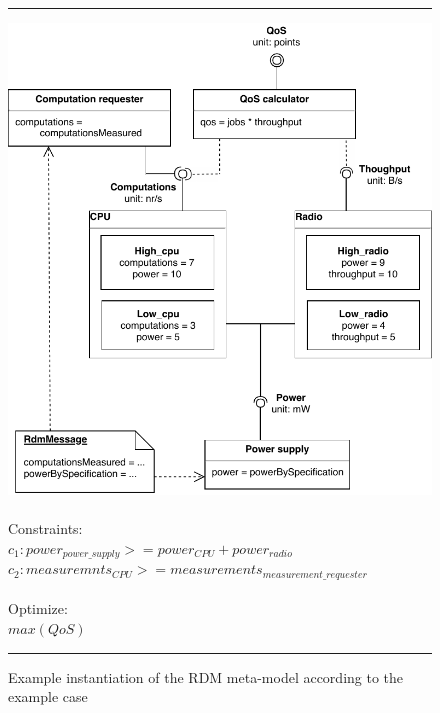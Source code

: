 \begin{figure}
\hrule
\begingroup\centering
  \includegraphics[width=\linewidth]{resources/img/rdm_cpu_radio.pdf}\endgroup \\ \\
  \noindent Constraints: \\
$c_1: power_{power\_supply} >= power_{CPU}+power_{radio} $ \\ 
$c_2: measuremnts_{CPU} >= measurements_{measurement\_requester}$ \\ \\
\noindent Optimize:\\$max(QoS)$\\
\hrule
\caption{Example instantiation of the RDM meta-model according to the example case}
  \label{fig:rdm_cpu_radio}
\end{figure}

